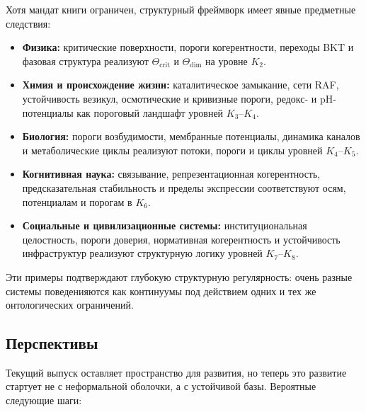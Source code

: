 Хотя мандат книги ограничен, структурный фреймворк имеет явные предметные следствия:

\begin{itemize}
    \item \textbf{Физика:} критические поверхности, пороги когерентности, переходы BKT и
          фазовая структура реализуют \(\Theta_{\mathrm{crit}}\) и \(\Theta_{\mathrm{dim}}\)
          на уровне \(K_2\).
    \item \textbf{Химия и происхождение жизни:} каталитическое замыкание, сети RAF,
          устойчивость везикул, осмотические и кривизные пороги, редокс- и pH-потенциалы
          как пороговый ландшафт уровней \(K_3\)–\(K_4\).
    \item \textbf{Биология:} пороги возбудимости, мембранные потенциалы,
          динамика каналов и метаболические циклы реализуют потоки, пороги и циклы
          уровней \(K_4\)–\(K_5\).
    \item \textbf{Когнитивная наука:} связывание, репрезентационная когерентность,
          предсказательная стабильность и пределы экспрессии соответствуют осям,
          потенциалам и порогам в \(K_6\).
    \item \textbf{Социальные и цивилизационные системы:} институциональная целостность,
          пороги доверия, нормативная когерентность и устойчивость инфраструктур
          реализуют структурную логику уровней \(K_7\)–\(K_8\).
\end{itemize}

Эти примеры подтверждают глубокую структурную регулярность: очень разные системы
поведенияются как континуумы под действием одних и тех же онтологических ограничений.

\subsection{Перспективы}

Текущий выпуск оставляет пространство для развития, но теперь это развитие
стартует не с неформальной оболочки, а с устойчивой базы. Вероятные следующие шаги:

